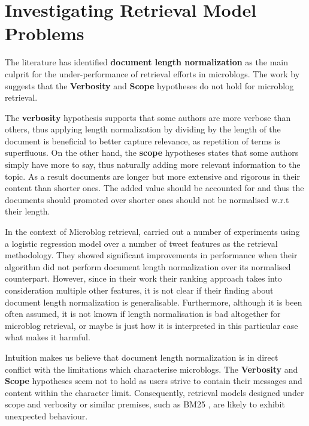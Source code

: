 \section{Investigating Retrieval Model Problems}
\label{RMinvestigation}
The literature has identified \textbf{document length normalization} as the main culprit for the under-performance of retrieval efforts in microblogs. The work by \cite{naveed2011searching} suggests that the \textbf{Verbosity} and \textbf{Scope} hypotheses do not hold for microblog retrieval.

The \textbf{verbosity} hypothesis supports that some authors are more verbose than others, thus applying length normalization by dividing by the length of the document is beneficial to better capture relevance, as repetition of terms is superfluous. On the other hand, the \textbf{scope} hypotheses states that some authors simply have more to say, thus naturally adding more relevant information to the topic. As a result documents are longer but more extensive and rigorous in their content than shorter ones. The added value should be accounted for and thus the documents should promoted over shorter ones should not be normalised w.r.t their length.

In the context of Microblog retrieval, \cite{naveed2011searching} carried out a number of experiments using a logistic regression model over a number of tweet features as the retrieval methodology. They showed significant improvements in performance when their algorithm did not perform document length normalization over its normalised counterpart. However, since in their work their ranking approach takes into consideration multiple other features, it is not clear if their finding about document length normalization is generalisable. Furthermore, although it is been often assumed, it is not known if length normalisation is bad altogether for microblog retrieval, or maybe is just how it is interpreted in this particular case what makes it harmful.

Intuition makes us believe that document length normalization is in direct conflict with the limitations which characterise microblogs. The \textbf{Verbosity} and \textbf{Scope} hypotheses seem not to hold as users strive to contain their messages and content within the character limit. Consequently, retrieval models designed under scope and verbosity or similar premises, such as BM25 \cite{robertson2009probabilistic}, are likely to exhibit unexpected behaviour.

